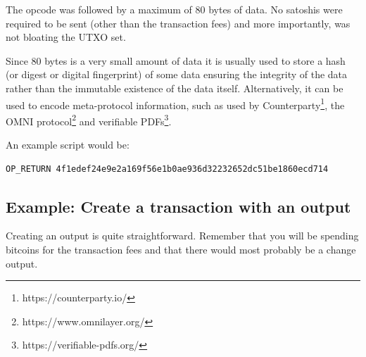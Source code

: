 The  opcode was followed by a maximum of 80 bytes of data. No satoshis were required to be sent (other than the transaction fees) and more importantly,  was not bloating the UTXO set.

Since 80 bytes is a very small amount of data it is usually used to store a hash (or digest or digital fingerprint) of some data ensuring the integrity of the data rather than the immutable existence of the data itself. Alternatively, it can be used to encode meta-protocol information, such as used by Counterparty\footnote{https://counterparty.io/}, the OMNI protocol\footnote{https://www.omnilayer.org/} and verifiable PDFs\footnote{https://verifiable-pdfs.org/}.%

An example script would be:

\begin{emphbox}
\begin{lstlisting}[style=Pseudomath]
OP_RETURN 4f1edef24e9e2a169f56e1b0ae936d32232652dc51be1860ecd714
\end{lstlisting}
\end{emphbox}


\subsection*{Example: Create a transaction with an  output}
Creating an  output is quite straightforward. Remember that you will be spending bitcoins for the transaction fees and that there would most probably be a change output.


